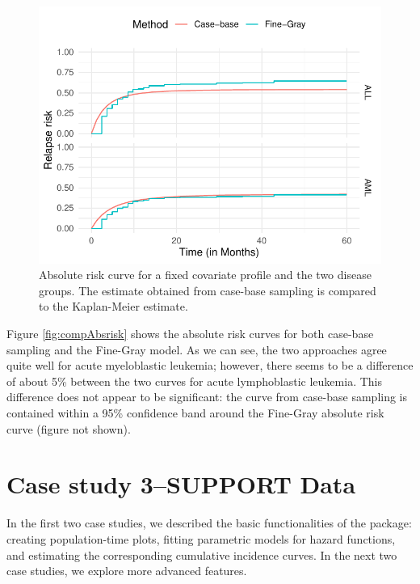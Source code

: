 \documentclass[
]{jss}
\begin{document}
\begin{CodeChunk}
\begin{figure}

{\centering \includegraphics{../figures/bmtcrr-risk-1} 

}

\caption{\label{fig:compAbsrisk}Absolute risk curve for a fixed covariate profile and the two disease groups. The estimate obtained from case-base sampling is compared to the Kaplan-Meier estimate.}\label{fig:bmtcrr-risk}
\end{figure}
\end{CodeChunk}

Figure \ref{fig:compAbsrisk} shows the absolute risk curves for both
case-base sampling and the Fine-Gray model. As we can see, the two
approaches agree quite well for acute myeloblastic leukemia; however,
there seems to be a difference of about 5\% between the two curves for
acute lymphoblastic leukemia. This difference does not appear to be
significant: the curve from case-base sampling is contained within a
95\% confidence band around the Fine-Gray absolute risk curve (figure
not shown).

\hypertarget{case-study-3support-data}{%
\section{Case study 3--SUPPORT Data}\label{case-study-3support-data}}

In the first two case studies, we described the basic functionalities of
the  package: creating population-time plots, fitting
parametric models for hazard functions, and estimating the corresponding
cumulative incidence curves. In the next two case studies, we explore
more advanced features.
\end{document}
